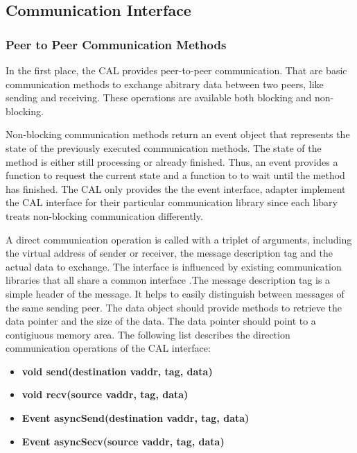 \subsection{Communication Interface}
\label{sec:cal_comm}
\subsubsection{Peer to Peer Communication Methods}

In the first place, the CAL provides peer-to-peer communication. That
are basic communication methods to exchange abitrary data between two
peers, like sending and receiving.  These operations are available
both blocking and non-blocking.

Non-blocking communication methods return an event object that represents
the state of the previously executed communication methods. The state
of the method is either still processing or already finished. Thus, an
event provides a function to request the current state and a function
to to wait until the method has finished. The CAL only provides the
the event interface, adapter implement the CAL interface for their
particular communication library since each libary treats non-blocking
communication differently.

A direct communication operation is called with a triplet of
arguments, including the virtual address of sender or receiver, the
message description tag and the actual data to exchange.  The
interface is influenced by existing communication libraries that all
share a common interface \cite{ref:boost_mpi, ref:boost_asio,
  ref:zmq}.The message description tag is a simple header of the
message. It helps to easily distinguish between messages of the same
sending peer.  The data object should provide methods to retrieve the
data pointer and the size of the data. The data pointer should point
to a contigiuous memory area. The following list describes the
direction communication operations of the CAL interface:

\begin{itemize}
  \item [] \textbf{void send(destination vaddr, tag, data)}
  \item [] \textbf{void recv(source vaddr, tag, data)}
  \item [] \textbf{Event asyncSend(destination vaddr, tag, data)}
  \item [] \textbf{Event asyncSecv(source vaddr, tag, data)}
\end{itemize}

